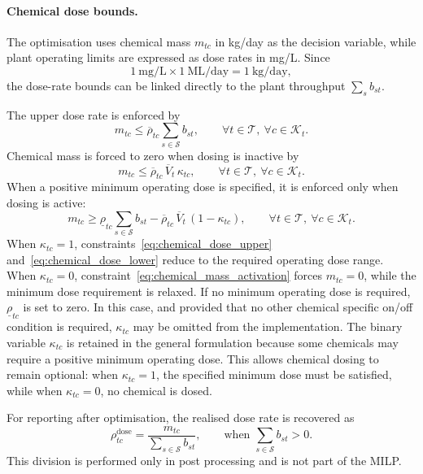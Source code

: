 \documentclass[10pt]{article}
\begin{document}
\paragraph{Chemical dose bounds.}
The optimisation uses chemical mass $m_{tc}$ in kg/day as the decision variable, while plant operating limits are expressed as dose rates in mg/L.
Since
\[
1\ \mathrm{mg/L} \times 1\ \mathrm{ML/day} = 1\ \mathrm{kg/day},
\]
the dose-rate bounds can be linked directly to the plant throughput $\sum_s b_{st}$.

The upper dose rate is enforced by
\begin{equation}\label{eq:chemical_dose_upper}
    m_{tc}
    \le
    \overline{\rho}_{tc}
    \sum_{s \in \mathcal{S}} b_{st},
    \qquad
    \forall t \in \mathcal{T},\ \forall c \in \mathcal{K}_t.
\end{equation}
Chemical mass is forced to zero when dosing is inactive by
\begin{equation}\label{eq:chemical_mass_activation}
    m_{tc}
    \le
    \overline{\rho}_{tc}\,\overline{V}_t\,\kappa_{tc},
    \qquad
    \forall t \in \mathcal{T},\ \forall c \in \mathcal{K}_t.
\end{equation}
When a positive minimum operating dose is specified, it is enforced only when dosing is active:
\begin{equation}\label{eq:chemical_dose_lower}
    m_{tc}
    \ge
    \underline{\rho}_{tc}
    \sum_{s \in \mathcal{S}} b_{st}
    -
    \overline{\rho}_{tc}\,\overline{V}_t\,(1-\kappa_{tc}),
    \qquad
    \forall t \in \mathcal{T},\ \forall c \in \mathcal{K}_t.
\end{equation}
When $\kappa_{tc}=1$, constraints~\eqref{eq:chemical_dose_upper} and~\eqref{eq:chemical_dose_lower} reduce to the required operating dose range.
When $\kappa_{tc}=0$, constraint~\eqref{eq:chemical_mass_activation} forces $m_{tc}=0$, while the minimum dose requirement is relaxed.
If no minimum operating dose is required, $\underline{\rho}_{tc}$ is set to zero.
In this case, and provided that no other chemical specific on/off condition is required, $\kappa_{tc}$ may be omitted from the implementation.
The binary variable $\kappa_{tc}$ is retained in the general formulation because some chemicals may require a positive minimum operating dose.
This allows chemical dosing to remain optional: when $\kappa_{tc}=1$, the specified minimum dose must be satisfied, while when $\kappa_{tc}=0$, no chemical is dosed.

For reporting after optimisation, the realised dose rate is recovered as
\begin{equation}\label{eq:chemical_dose_reporting}
    \rho^{\mathrm{dose}}_{tc}
    =
    \frac{m_{tc}}
    {\sum_{s \in \mathcal{S}} b_{st}},
    \qquad
    \text{when }
    \sum_{s \in \mathcal{S}} b_{st} > 0.
\end{equation}
This division is performed only in post processing and is not part of the MILP.
\end{document}
